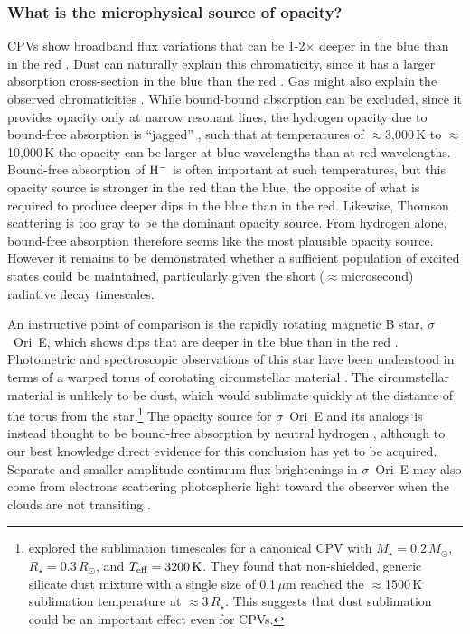 \documentclass[11pt,twocolumn,tighten]{aastex63}
\begin{document}
\subsubsection{What is the microphysical source of opacity?}

CPVs show broadband flux variations that can be 1-2$\times$ deeper in
the blue than in the red
\citep{2017PASJ...69L...2O,2020AJ....160...86B,2022AJ....163..144G,2023MNRAS.518.2921K}.
Dust can naturally explain this chromaticity, since it has a larger
absorption cross-section in the blue than the red
\citep[e.g.][]{1989ApJ...345..245C}.  Gas might also explain the
observed chromaticities \citep{1992oasp.book.....G}.  While
bound-bound absorption can be excluded, since it provides opacity only
at narrow resonant lines, the hydrogen opacity due to bound-free
absorption is ``jagged'' \citep[see][Figure 8.5 and
Eq.~8.8]{1992oasp.book.....G}, such that at temperatures of
$\approx$3{,}000\,K to $\approx$10{,}000\,K the opacity can be larger
at blue wavelengths than at red wavelengths.  Bound-free absorption of
${\rm H}^{-}$ is often important at such temperatures, but this
opacity source is stronger in the red than the blue, the opposite of
what is required to produce deeper dips in the blue than in the red.
Likewise, Thomson scattering is too gray to be the dominant opacity
source.  From hydrogen alone, bound-free absorption therefore seems
like the most plausible opacity source.  However it remains to be
demonstrated whether a sufficient population of excited states could
be maintained, particularly given the short ($\approx$microsecond)
radiative decay timescales.

An instructive point of comparison is the rapidly rotating magnetic B
star, $\sigma$~Ori~E, which shows dips that are deeper in the blue
than in the red \citep{1977ApJ...216L..31H}.  Photometric and
spectroscopic observations of this star have been understood in terms
of a warped torus of corotating circumstellar material
\citep{1978ApJ...224L...5L,1985Ap&SS.116..285N,2005ApJ...630L..81T}.
The circumstellar material is unlikely to be dust, which would
sublimate quickly at the distance of the torus from the
star.\footnote{\citet{2019ApJ...876..127Z} explored the sublimation
timescales for a canonical CPV with $M_\star=0.2\,M_\odot$,
$R_\star=0.3\,R_\odot$, and $T_{\rm eff}=3200\,{\rm K}$.  They found
that non-shielded, generic silicate dust mixture
\citep{1985ApJS...57..587D} with a single size of 0.1\,$\mu$m reached
the $\approx$1500\,K sublimation temperature at $\approx$3\,$R_\star$.
This suggests that dust sublimation could be an important effect even
for CPVs. }  The opacity source for $\sigma$~Ori~E and its analogs is
instead thought to be bound-free absorption by neutral hydrogen
\citep{1985Ap&SS.116..285N}, although to our best knowledge direct
evidence for this conclusion has yet to be acquired.  Separate and
smaller-amplitude continuum flux brightenings in $\sigma$~Ori~E may
also come from electrons scattering photospheric light toward the
observer when the clouds are not transiting
\citep{2022MNRAS.511.4815B}.
\end{document}
